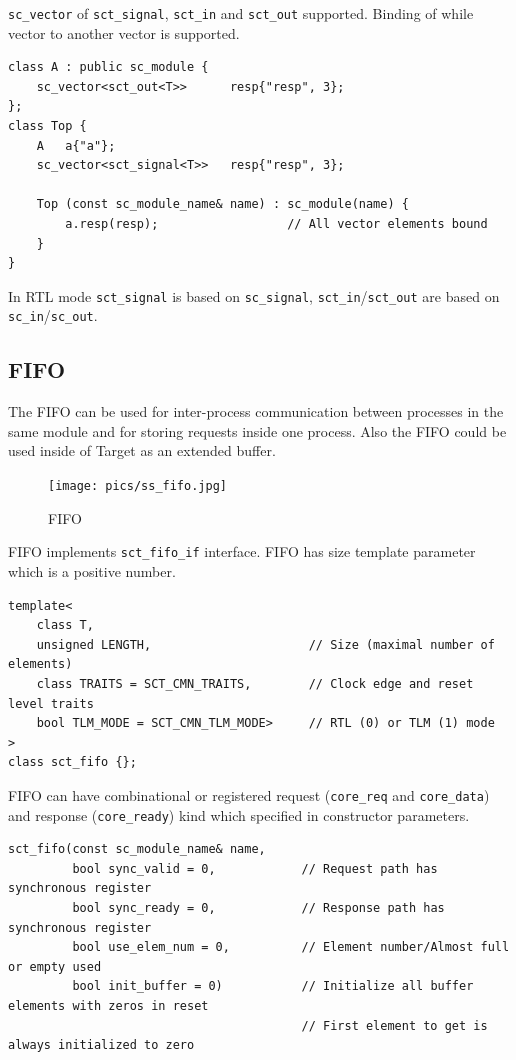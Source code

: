 {\tt sc\_vector} of {\tt sct\_signal}, {\tt sct\_in} and {\tt sct\_out} supported. Binding of while vector to another vector is supported.
\begin{lstlisting}[style=mycpp]
class A : public sc_module {
    sc_vector<sct_out<T>>      resp{"resp", 3};
};
class Top {
    A   a{"a"};
    sc_vector<sct_signal<T>>   resp{"resp", 3};

    Top (const sc_module_name& name) : sc_module(name) {        
        a.resp(resp);                  // All vector elements bound
    }
}
\end{lstlisting}

In RTL mode {\tt sct\_signal} is based on {\tt sc\_signal}, {\tt sct\_in}/{\tt sct\_out} are based on {\tt sc\_in}/{\tt sc\_out}.


\subsection{FIFO}\label{section:sct_fifo}

The FIFO can be used for inter-process communication between processes in the same module and for storing requests inside one process. Also the FIFO could be used inside of Target as an extended buffer.

\begin{figure}[!htb]
\centering
\texttt{[image: pics/ss\_fifo.jpg]}
\caption{FIFO}
\label{fig:ss_fifo}
\end{figure}

FIFO implements {\tt sct\_fifo\_if} interface. FIFO has size template parameter which is a positive number.
\begin{lstlisting}[style=mycpp]
template<
    class T, 
    unsigned LENGTH,                      // Size (maximal number of elements)
    class TRAITS = SCT_CMN_TRAITS,        // Clock edge and reset level traits
    bool TLM_MODE = SCT_CMN_TLM_MODE>     // RTL (0) or TLM (1) mode
>
class sct_fifo {};
\end{lstlisting}

FIFO can have combinational or registered request ({\tt core\_req} and {\tt core\_data}) and response ({\tt core\_ready}) kind which specified in constructor parameters.
\begin{lstlisting}[style=mycpp]
sct_fifo(const sc_module_name& name, 
         bool sync_valid = 0,            // Request path has synchronous register 
         bool sync_ready = 0,            // Response path has synchronous register  
         bool use_elem_num = 0,          // Element number/Almost full or empty used 
         bool init_buffer = 0)           // Initialize all buffer elements with zeros in reset
                                         // First element to get is always initialized to zero 
\end{lstlisting}

